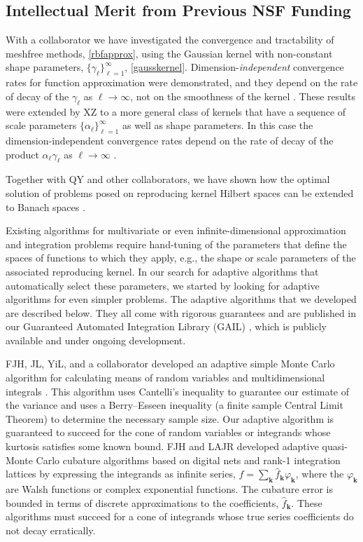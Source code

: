 \documentclass[11pt]{NSFamsart}
\newcommand{\hatf}{\hat{f}}
\newcommand{\bk}{{\boldsymbol{k}}}
\begin{document}
\subsection{Intellectual Merit from Previous NSF Funding}
\label{previousmeritsubsec}

With a collaborator we have investigated the convergence and tractability of meshfree methods, \eqref{rbfapprox}, using the Gaussian kernel with non-constant shape parameters, $\{\gamma_{\ell}\}_{\ell =1}^{\infty}$, \eqref{gausskernel}. Dimension-\emph{independent} convergence rates for function approximation were demonstrated, and they depend on the rate of decay of the $\gamma_{\ell}$ as $\ell \to \infty$, not on the smoothness of the kernel \citep{FasHicWoz12b, FasHicWoz12a}. These results were extended by XZ to a more general class of kernels that have a sequence of scale parameters $\{\alpha_{\ell}\}_{\ell=1}^{\infty}$ as well as shape parameters.  In this case the dimension-independent convergence rates depend on the rate of decay of the product $\alpha_{\ell} \gamma_{\ell}$ as $\ell \to \infty$ \citep{ZhoHic15a}.

Together with QY and other collaborators, we have shown how the optimal solution of problems posed on reproducing kernel Hilbert spaces can be extended to Banach spaces \citep{SonZhaHic12a, FasHicYe13a}.

Existing algorithms for multivariate or even infinite-dimensional approximation and integration problems require hand-tuning of the parameters that define the spaces of functions to which they apply, e.g., the shape or scale parameters of the associated reproducing kernel.  In our search for adaptive algorithms that automatically select these parameters, we started by looking for adaptive algorithms for even simpler problems. The adaptive algorithms that we developed are described below.  They all come with rigorous guarantees and are published in our Guaranteed Automated Integration Library (GAIL) \citep{ChoEtal14a}, which is publicly available and under ongoing development.

FJH, JL, YiL, and a collaborator developed an adaptive simple Monte Carlo algorithm for calculating means of random variables and multidimensional integrals \citep{HicEtal14a}.  This algorithm uses Cantelli's inequality to guarantee our estimate of the variance and uses a Berry--Esseen inequality (a finite sample Central Limit Theorem) to determine the necessary sample size.  Our adaptive algorithm is guaranteed to succeed for the cone of random variables or integrands whose kurtosis satisfies some known bound.  FJH and LAJR developed adaptive quasi-Monte Carlo cubature algorithms based on digital nets \citep{HicJim16a} and rank-1 integration lattices \citep{JimHic16a} by expressing the integrands as infinite series, $f=\sum_{\bk} \hatf_\bk \varphi_{\bk}$, where the $\varphi_{\bk}$ are Walsh functions or complex exponential functions.  The cubature error is bounded in terms of discrete  approximations to the coefficients, $\hatf_\bk$.  These algorithms must succeed for a cone of integrands whose true series coefficients do not decay erratically.
\end{document}
